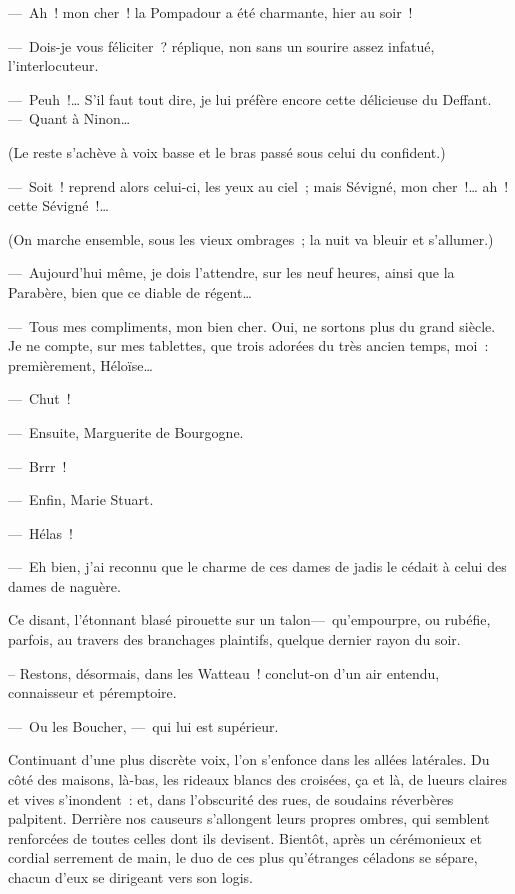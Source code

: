 \documentclass[french,twoside]{book} %
\begin{document}
— Ah ! mon cher ! la Pompadour a été charmante, hier au soir !\par
— Dois-je vous féliciter ? réplique, non sans un sourire assez infatué, l’interlocuteur.\par
— Peuh !… S’il faut tout dire, je lui préfère encore cette délicieuse du Deffant. — Quant à Ninon…\par
(Le reste s’achève à voix basse et le bras passé sous celui du confident.)\par
— Soit ! reprend alors celui-ci, les yeux au   ciel ; mais Sévigné, mon cher !… ah ! cette Sévigné !…\par
(On marche ensemble, sous les vieux ombrages ; la nuit va bleuir et s’allumer.)\par
— Aujourd’hui même, je dois l’attendre, sur les neuf heures, ainsi que la Parabère, bien que ce diable de régent…\par
— Tous mes compliments, mon bien cher. Oui, ne sortons plus du grand siècle. Je ne compte, sur mes tablettes, que trois adorées du très ancien temps, moi : premièrement, Héloïse…\par
— Chut !\par
— Ensuite, Marguerite de Bourgogne.\par
— Brrr !\par
— Enfin, Marie Stuart.\par
— Hélas !\par
— Eh bien, j’ai reconnu que le charme de ces dames de jadis le cédait à celui des dames de naguère.\par
Ce disant, l’étonnant blasé pirouette sur un talon— qu’empourpre, ou rubéfie, parfois, au travers des branchages plaintifs, quelque dernier rayon du soir.\par
   – Restons, désormais, dans les Watteau ! conclut-on d’un air entendu, connaisseur et péremptoire.\par
— Ou les Boucher, — qui lui est supérieur.\par
Continuant d’une plus discrète voix, l’on s’enfonce dans les allées latérales. Du côté des maisons, là-bas, les rideaux blancs des croisées, ça et là, de lueurs claires et vives s’inondent : et, dans l’obscurité des rues, de soudains réverbères palpitent. Derrière nos causeurs s’allongent leurs propres ombres, qui semblent renforcées de toutes celles dont ils devisent. Bientôt, après un cérémonieux et cordial serrement de main, le duo de ces plus qu’étranges céladons se sépare, chacun d’eux se dirigeant vers son logis.\par
\end{document}
